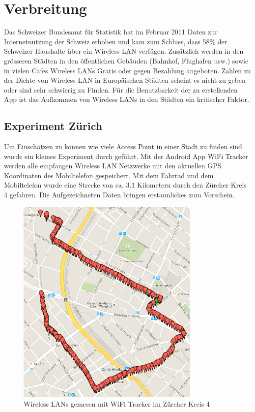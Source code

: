 \section{Verbreitung}
Das Schweizer Bundesamt für Statistik hat im Februar 2011 Daten zur Internetnutzung der Schweiz erhoben und kam zum Schluss, dass 58\% der Schweizer Haushalte über ein Wireless LAN verfügen\citep[S. 8]{bfs.internet.2011}. Zusätzlich werden in den grösseren Städten in den öffentlichen Gebäuden (Bahnhof, Flughafen usw.) sowie in vielen Cafes Wireless LANs Gratis oder gegen Bezahlung angeboten. Zahlen zu der Dichte von Wireless LAN in Europäischen Städten scheint es nicht zu geben oder sind sehr schwierig zu Finden. Für die Benutzbarkeit der zu erstellenden App ist das Aufkommen von Wireless LANs in den Städten ein kritischer Faktor.

\subsection{Experiment Zürich}
Um Einschätzen zu können wie viele Access Point in einer Stadt zu finden sind wurde ein kleines Experiment durch geführt. Mit der Android App WiFi Tracker\citep{google.play.wifitracker} werden alle empfangen Wireless LAN Netzwerke mit den aktuellen GPS Koordinaten des Mobiltelefon gespeichert. Mit dem Fahrrad und dem Mobiltelefon wurde eine Strecke von ca. 3.1 Kilometern durch den Zürcher Kreis 4 gefahren. Die Aufgezeichneten Daten bringen erstaunliches zum Vorschein.
\begin{figure}[ht]
	\centering
	\includegraphics[width=0.8\textwidth]{images/wifikreis4.png}
	\caption{Wireless LANs gemesen mit WiFi Tracker im Zürcher Kreis 4}
	\label{fig:wifikreis4}
\end{figure}
